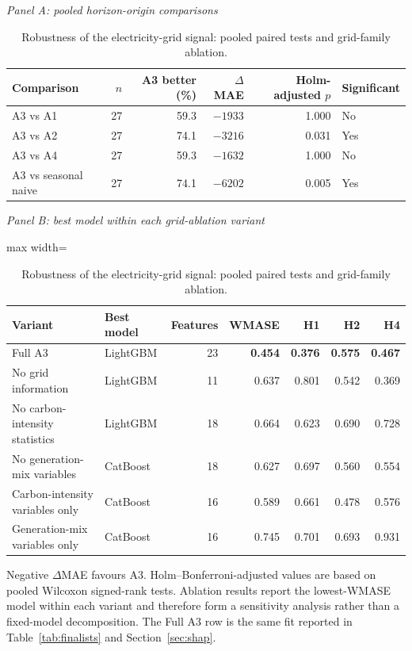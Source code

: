 \documentclass[preprint,12pt]{elsarticle}
\begin{document}
\begin{table}[p]
\centering
\caption{Robustness of the electricity-grid signal: pooled paired tests and grid-family ablation.}
\label{tab:grid_robustness}
\scriptsize
\begin{threeparttable}
\textit{Panel A: pooled horizon-origin comparisons}\\[2pt]
\begin{tabular}{@{}lrrrrl@{}}
\toprule
Comparison & $n$ & A3 better (\%) & $\Delta$MAE & Holm-adjusted $p$ & Significant \\
\midrule
A3 vs A1 & 27 & 59.3 & $-1933$ & 1.000 & No \\
A3 vs A2 & 27 & 74.1 & $-3216$ & 0.031 & Yes \\
A3 vs A4 & 27 & 59.3 & $-1632$ & 1.000 & No \\
A3 vs seasonal naive & 27 & 74.1 & $-6202$ & 0.005 & Yes \\
\bottomrule
\end{tabular}

\vspace{1.0em}
\textit{Panel B: best model within each grid-ablation variant}\\[2pt]
\begin{adjustbox}{max width=\textwidth}
\begin{tabular}{@{}llrrrrr@{}}
\toprule
Variant & Best model & Features & WMASE & H1 & H2 & H4 \\
\midrule
Full A3 & LightGBM & 23 & \textbf{0.454} & \textbf{0.376} & \textbf{0.575} & \textbf{0.467} \\
No grid information & LightGBM & 11 & 0.637 & 0.801 & 0.542 & 0.369 \\
No carbon-intensity statistics & LightGBM & 18 & 0.664 & 0.623 & 0.690 & 0.728 \\
No generation-mix variables & CatBoost & 18 & 0.627 & 0.697 & 0.560 & 0.554 \\
Carbon-intensity variables only & CatBoost & 16 & 0.589 & 0.661 & 0.478 & 0.576 \\
Generation-mix variables only & CatBoost & 16 & 0.745 & 0.701 & 0.693 & 0.931 \\
\bottomrule
\end{tabular}
\end{adjustbox}
\begin{tablenotes}[flushleft]
\footnotesize
\item Negative $\Delta$MAE favours A3. Holm--Bonferroni-adjusted values are based on pooled Wilcoxon signed-rank tests. Ablation results report the lowest-WMASE model within each variant and therefore form a sensitivity analysis rather than a fixed-model decomposition. The Full A3 row is the same fit reported in Table~\ref{tab:finalists} and Section~\ref{sec:shap}.
\end{tablenotes}
\end{threeparttable}
\end{table}
\end{document}
